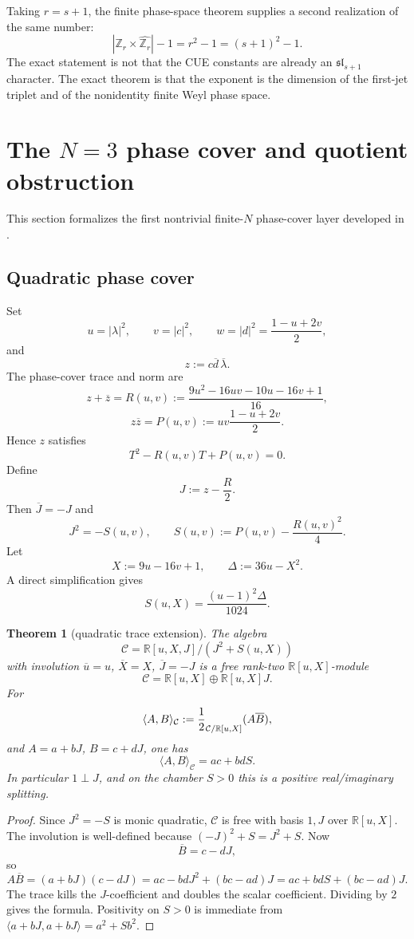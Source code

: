 \documentclass[11pt]{article}
\newtheorem{theorem}{Theorem}[section]
\let\Tr\relax
\DeclareMathOperator{\Tr}{Tr}
\newcommand{\R}{\mathbb R}
\newcommand{\Z}{\mathbb Z}
\begin{document}
Taking $r=s+1$, the finite phase-space theorem supplies a second realization of the
same number:
\[
|\Z_r\times\widehat{\Z_r}|-1=r^2-1=(s+1)^2-1.
\]
The exact statement is not that the CUE constants are already an $\mathfrak{sl}_{s+1}$
character.  The exact theorem is that the exponent is the dimension of the first-jet
triplet and of the nonidentity finite Weyl phase space.

\section{The $N=3$ phase cover and quotient obstruction}

This section formalizes the first nontrivial finite-$N$ phase-cover layer developed in
\cite{CMP}.

\subsection{Quadratic phase cover}

Set
\[
u=|\lambda|^2,
\qquad
v=|c|^2,
\qquad
w=|d|^2=\frac{1-u+2v}{2},
\]
and
\[
z:=c\overline d\,\overline\lambda.
\]
The phase-cover trace and norm are
\[
z+\overline z=R(u,v):=\frac{9u^2-16uv-10u-16v+1}{16},
\]
\[
z\overline z=P(u,v):=uv\frac{1-u+2v}{2}.
\]
Hence $z$ satisfies
\[
T^2-R(u,v)T+P(u,v)=0.
\]
Define
\[
J:=z-\frac{R}{2}.
\]
Then $\overline J=-J$ and
\[
J^2=-S(u,v),
\qquad
S(u,v):=P(u,v)-\frac{R(u,v)^2}{4}.
\]
Let
\[
X:=9u-16v+1,
\qquad
\Delta:=36u-X^2.
\]
A direct simplification gives
\[
S(u,X)=\frac{(u-1)^2\Delta}{1024}.
\]

\begin{theorem}[quadratic trace extension]
The algebra
\[
\mathcal C=\R[u,X,J]/(J^2+S(u,X))
\]
with involution $\overline u=u$, $\overline X=X$, $\overline J=-J$ is a free
rank-two $\R[u,X]$-module
\[
\mathcal C=\R[u,X]\oplus\R[u,X]J.
\]
For
\[
\langle A,B\rangle_{\mathcal C}:=\frac12\Tr_{\mathcal C/\R[u,X]}(A\overline B),
\]
and $A=a+bJ$, $B=c+dJ$, one has
\[
\langle A,B\rangle_{\mathcal C}=ac+bdS.
\]
In particular $1\perp J$, and on the chamber $S>0$ this is a positive
real/imaginary splitting.
\end{theorem}

\begin{proof}
Since $J^2=-S$ is monic quadratic, $\mathcal C$ is free with basis $1,J$ over
$\R[u,X]$.  The involution is well-defined because $(-J)^2+S=J^2+S$.  Now
\[
\overline B=c-dJ,
\]
so
\[
A\overline B=(a+bJ)(c-dJ)=ac-bdJ^2+(bc-ad)J=ac+bdS+(bc-ad)J.
\]
The trace kills the $J$-coefficient and doubles the scalar coefficient.  Dividing by
$2$ gives the formula.  Positivity on $S>0$ is immediate from
$\langle a+bJ,a+bJ\rangle=a^2+Sb^2$.
\end{proof}
\end{document}
